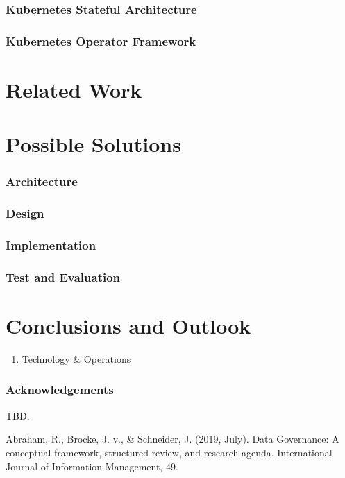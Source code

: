 \documentclass[runningheads]{llncs}
\begin{document}
\subsubsection{Kubernetes Stateful Architecture}

\subsubsection{Kubernetes Operator Framework}

\section{Related Work}

\section{Possible Solutions}

\subsubsection{Architecture}

\subsubsection{Design}

\subsubsection{Implementation}

\subsubsection{Test and Evaluation}

\section{Conclusions and Outlook}

\begin{enumerate}
    \item Technology \& Operations
\end{enumerate}
\subsubsection{Acknowledgements} TBD.
%
%
%
% 
% 
%
\begin{thebibliography}{8}
 Abraham, R., Brocke, J. v., \& Schneider, J. (2019, July). Data Governance: A conceptual framework, structured review, and research agenda. International Journal of Information Management, 49. 
\end{thebibliography}
\end{document}
